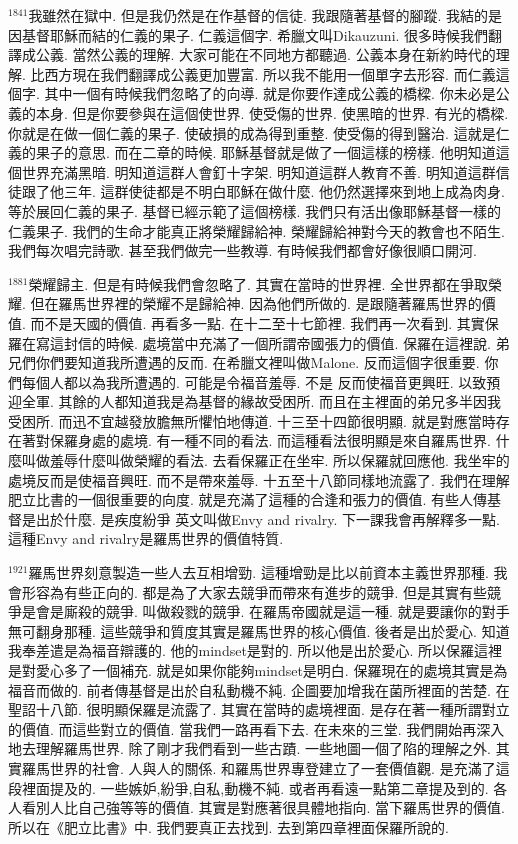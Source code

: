 \documentclass{book}
\begin{document}
$^{1841}$我雖然在獄中.
但是我仍然是在作基督的信徒.
我跟隨著基督的腳蹤.
我結的是因基督耶穌而結的仁義的果子.
仁義這個字.
希臘文叫Dikauzuni.
很多時候我們翻譯成公義.
當然公義的理解.
大家可能在不同地方都聽過.
公義本身在新約時代的理解.
比西方現在我們翻譯成公義更加豐富.
所以我不能用一個單字去形容.
而仁義這個字.
其中一個有時候我們忽略了的向導.
就是你要作達成公義的橋樑.
你未必是公義的本身.
但是你要參與在這個使世界.
使受傷的世界.
使黑暗的世界.
有光的橋樑.
你就是在做一個仁義的果子.
使破損的成為得到重整.
使受傷的得到醫治.
這就是仁義的果子的意思.
而在二章的時候.
耶穌基督就是做了一個這樣的榜樣.
他明知道這個世界充滿黑暗.
明知道這群人會釘十字架.
明知道這群人教育不善.
明知道這群信徒跟了他三年.
這群使徒都是不明白耶穌在做什麼.
他仍然選擇來到地上成為肉身.
等於展回仁義的果子.
基督已經示範了這個榜樣.
我們只有活出像耶穌基督一樣的仁義果子.
我們的生命才能真正將榮耀歸給神.
榮耀歸給神對今天的教會也不陌生.
我們每次唱完詩歌.
甚至我們做完一些教導.
有時候我們都會好像很順口開河.

$^{1881}$榮耀歸主.
但是有時候我們會忽略了.
其實在當時的世界裡.
全世界都在爭取榮耀.
但在羅馬世界裡的榮耀不是歸給神.
因為他們所做的.
是跟隨著羅馬世界的價值.
而不是天國的價值.
再看多一點.
在十二至十七節裡.
我們再一次看到.
其實保羅在寫這封信的時候.
處境當中充滿了一個所謂帝國張力的價值.
保羅在這裡說.
弟兄們你們要知道我所遭遇的反而.
在希臘文裡叫做Malone.
反而這個字很重要.
你們每個人都以為我所遭遇的.
可能是令福音羞辱.
不是 反而使福音更興旺.
以致預迎全軍.
其餘的人都知道我是為基督的緣故受困所.
而且在主裡面的弟兄多半因我受困所.
而迅不宜越發放膽無所懼怕地傳道.
十三至十四節很明顯.
就是對應當時存在著對保羅身處的處境.
有一種不同的看法.
而這種看法很明顯是來自羅馬世界.
什麼叫做羞辱什麼叫做榮耀的看法.
去看保羅正在坐牢.
所以保羅就回應他.
我坐牢的處境反而是使福音興旺.
而不是帶來羞辱.
十五至十八節同樣地流露了.
我們在理解肥立比書的一個很重要的向度.
就是充滿了這種的合逢和張力的價值.
有些人傳基督是出於什麼.
是疾度紛爭 英文叫做Envy and rivalry.
下一課我會再解釋多一點.
這種Envy and rivalry是羅馬世界的價值特質.

$^{1921}$羅馬世界刻意製造一些人去互相增勁.
這種增勁是比以前資本主義世界那種.
我會形容為有些正向的.
都是為了大家去競爭而帶來有進步的競爭.
但是其實有些競爭是會是廝殺的競爭.
叫做殺戮的競爭.
在羅馬帝國就是這一種.
就是要讓你的對手無可翻身那種.
這些競爭和質度其實是羅馬世界的核心價值.
後者是出於愛心.
知道我奉差遣是為福音辯護的.
他的mindset是對的.
所以他是出於愛心.
所以保羅這裡是對愛心多了一個補充.
就是如果你能夠mindset是明白.
保羅現在的處境其實是為福音而做的.
前者傳基督是出於自私動機不純.
企圖要加增我在菌所裡面的苦楚.
在聖詔十八節.
很明顯保羅是流露了.
其實在當時的處境裡面.
是存在著一種所謂對立的價值.
而這些對立的價值.
當我們一路再看下去.
在未來的三堂.
我們開始再深入地去理解羅馬世界.
除了剛才我們看到一些古蹟.
一些地圖一個了陷的理解之外.
其實羅馬世界的社會.
人與人的關係.
和羅馬世界專登建立了一套價值觀.
是充滿了這段裡面提及的.
一些嫉妒,紛爭,自私,動機不純.
或者再看遠一點第二章提及到的.
各人看別人比自己強等等的價值.
其實是對應著很具體地指向.
當下羅馬世界的價值.
所以在《肥立比書》中.
我們要真正去找到.
去到第四章裡面保羅所說的.
\end{document}
